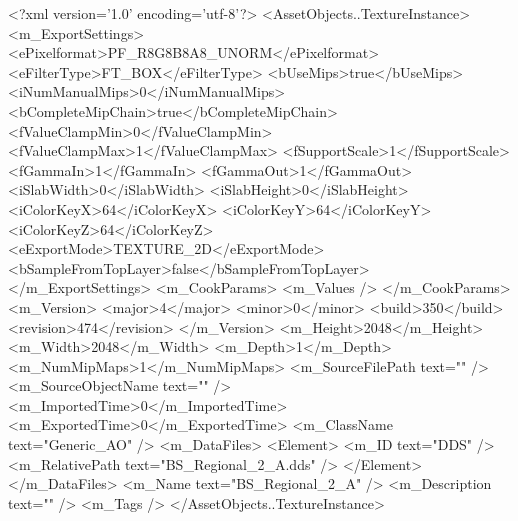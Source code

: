 <?xml version='1.0' encoding='utf-8'?>
<AssetObjects..TextureInstance>
  <m_ExportSettings>
    <ePixelformat>PF_R8G8B8A8_UNORM</ePixelformat>
    <eFilterType>FT_BOX</eFilterType>
    <bUseMips>true</bUseMips>
    <iNumManualMips>0</iNumManualMips>
    <bCompleteMipChain>true</bCompleteMipChain>
    <fValueClampMin>0</fValueClampMin>
    <fValueClampMax>1</fValueClampMax>
    <fSupportScale>1</fSupportScale>
    <fGammaIn>1</fGammaIn>
    <fGammaOut>1</fGammaOut>
    <iSlabWidth>0</iSlabWidth>
    <iSlabHeight>0</iSlabHeight>
    <iColorKeyX>64</iColorKeyX>
    <iColorKeyY>64</iColorKeyY>
    <iColorKeyZ>64</iColorKeyZ>
    <eExportMode>TEXTURE_2D</eExportMode>
    <bSampleFromTopLayer>false</bSampleFromTopLayer>
  </m_ExportSettings>
  <m_CookParams>
    <m_Values />
  </m_CookParams>
  <m_Version>
    <major>4</major>
    <minor>0</minor>
    <build>350</build>
    <revision>474</revision>
  </m_Version>
  <m_Height>2048</m_Height>
  <m_Width>2048</m_Width>
  <m_Depth>1</m_Depth>
  <m_NumMipMaps>1</m_NumMipMaps>
  <m_SourceFilePath text="" />
  <m_SourceObjectName text="" />
  <m_ImportedTime>0</m_ImportedTime>
  <m_ExportedTime>0</m_ExportedTime>
  <m_ClassName text="Generic_AO" />
  <m_DataFiles>
    <Element>
      <m_ID text="DDS" />
      <m_RelativePath text="BS_Regional_2_A.dds" />
    </Element>
  </m_DataFiles>
  <m_Name text="BS_Regional_2_A" />
  <m_Description text="" />
  <m_Tags />
</AssetObjects..TextureInstance>